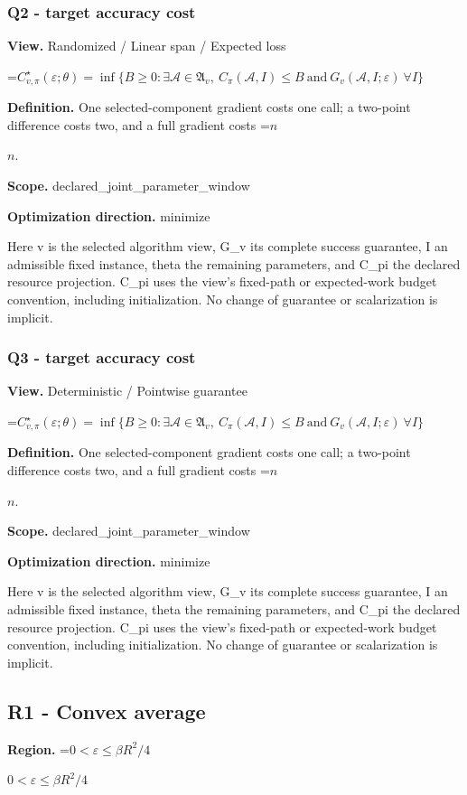 \documentclass[10pt,a4paper]{article}
\newcommand{\AtlasMath}[1]{\par\begingroup\centering\setbox0=\hbox{$\displaystyle #1$}\ifdim\wd0>1.4\linewidth\typeout{ATLAS WIDE FORMULA: \the\wd0}\fi\ifdim\wd0>\linewidth\resizebox{\linewidth}{!}{\box0}\else\box0\fi\par\endgroup}
\newcommand{\AtlasInlineMath}[1]{\begingroup\setbox0=\hbox{$#1$}\ifdim\wd0>.4\linewidth\endgroup\AtlasMath{#1}\else\endgroup$#1$\fi}
\begin{document}
\subsubsection{Q2 - target accuracy cost}
\textbf{View.} Randomized / Linear span / Expected loss

\AtlasMath{C^\star_{v,\pi}(\varepsilon;\theta)=\inf\{B\ge0:\exists\mathcal A\in\mathfrak A_v,\ C_\pi(\mathcal A,I)\le B\ \text{and}\ G_v(\mathcal A,I;\varepsilon)\ \forall I\}}
\textbf{Definition.} One selected-component gradient costs one call; a two-point difference costs two, and a full gradient costs \AtlasInlineMath{n}.

\textbf{Scope.} declared\_joint\_parameter\_window

\textbf{Optimization direction.} minimize

Here v is the selected algorithm view, G\_v its complete success guarantee, I an admissible fixed instance, theta the remaining parameters, and C\_pi the declared resource projection. C\_pi uses the view's fixed-path or expected-work budget convention, including initialization. No change of guarantee or scalarization is implicit.

\subsubsection{Q3 - target accuracy cost}
\textbf{View.} Deterministic / Pointwise guarantee

\AtlasMath{C^\star_{v,\pi}(\varepsilon;\theta)=\inf\{B\ge0:\exists\mathcal A\in\mathfrak A_v,\ C_\pi(\mathcal A,I)\le B\ \text{and}\ G_v(\mathcal A,I;\varepsilon)\ \forall I\}}
\textbf{Definition.} One selected-component gradient costs one call; a two-point difference costs two, and a full gradient costs \AtlasInlineMath{n}.

\textbf{Scope.} declared\_joint\_parameter\_window

\textbf{Optimization direction.} minimize

Here v is the selected algorithm view, G\_v its complete success guarantee, I an admissible fixed instance, theta the remaining parameters, and C\_pi the declared resource projection. C\_pi uses the view's fixed-path or expected-work budget convention, including initialization. No change of guarantee or scalarization is implicit.

\subsection{R1 - Convex average}
\textbf{Region.} \AtlasInlineMath{0<\varepsilon\le\beta R^2/4}
\end{document}
